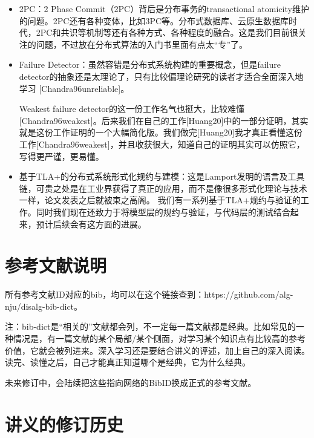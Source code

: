 \documentclass[UTF8]{ctexrep}
\begin{document}
\begin{itemize}
    \item 2PC：2 Phase Commit（2PC）背后是分布事务的transactional atomicity维护的问题。2PC还有各种变体，比如3PC等。分布式数据库、云原生数据库时代，2PC和共识等机制等还有各种方式、各种程度的融合。这是我们目前很关注的问题，不过放在分布式算法的入门书里面有点太“专”了。
    
    \item Failure Detector：虽然容错是分布式系统构建的重要概念，但是failure detector的抽象还是太理论了，只有比较偏理论研究的读者才适合全面深入地学习 [Chandra96unreliable]。
    
    Weakest failure detector的这一份工作名气也挺大，比较难懂[Chandra96weakest]。后来我们在自己的工作[Huang20]中的一部分证明，其实就是这份工作证明的一个大幅简化版。我们做完[Huang20]我才真正看懂这份工作[Chandra96weakest]，并且收获很大，知道自己的证明其实可以仿照它，写得更严谨，更易懂。
    
    \item 基于TLA+的分布式系统形式化规约与建模：这是Lamport发明的语言及工具链，可贵之处是在工业界获得了真正的应用，而不是像很多形式化理论与技术一样，论文发表之后就被束之高阁。
    我们有一系列基于TLA+规约与验证的工作。同时我们现在还致力于将模型层的规约与验证，与代码层的测试结合起来，预计后续会有这方面的进展。
\end{itemize}


\chapter{参考文献说明}

所有参考文献ID对应的bib，均可以在这个链接查到：https://github.com/alg-nju/disalg-bib-dict。

注：bib-dict是“相关的”文献都会列，不一定每一篇文献都是经典。比如常见的一种情况是，有一篇文献的某个局部/某个侧面，对学习某个知识点有比较高的参考价值，它就会被列进来。深入学习还是要结合讲义的评述，加上自己的深入阅读。读完、读懂之后，自己才能真正知道哪个是经典，它为什么经典。

未来修订中，会陆续把这些指向网络的BibID换成正式的参考文献。

\chapter{讲义的修订历史}
\end{document}
